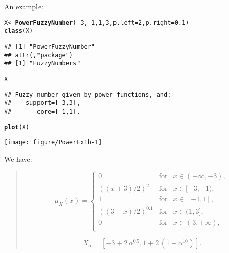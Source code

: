\documentclass[11pt]{article}\usepackage[]{graphicx}\usepackage[]{color}
\makeatletter
\newcommand{\hlnum}[1]{\textcolor[rgb]{0.686,0.059,0.569}{#1}}%
\newcommand{\hlopt}[1]{\textcolor[rgb]{0,0,0}{#1}}%
\newcommand{\hlstd}[1]{\textcolor[rgb]{0.345,0.345,0.345}{#1}}%
\newcommand{\hlkwb}[1]{\textcolor[rgb]{0.69,0.353,0.396}{#1}}%
\newcommand{\hlkwc}[1]{\textcolor[rgb]{0.333,0.667,0.333}{#1}}%
\newcommand{\hlkwd}[1]{\textcolor[rgb]{0.737,0.353,0.396}{\textbf{#1}}}%
\newenvironment{kframe}{%
 \def\at@end@of@kframe{}%
 \ifinner\ifhmode%
  \def\at@end@of@kframe{\end{minipage}}%
  \begin{minipage}{\columnwidth}%
 \fi\fi%
 \def\FrameCommand##1{\hskip\@totalleftmargin \hskip-\fboxsep
 \colorbox{shadecolor}{##1}\hskip-\fboxsep
     \hskip-\linewidth \hskip-\@totalleftmargin \hskip\columnwidth}%
 \MakeFramed {\advance\hsize-\width
   \@totalleftmargin\z@ \linewidth\hsize
   \@setminipage}}%
 {\par\unskip\endMakeFramed%
 \at@end@of@kframe}
\newenvironment{knitrout}{}{} %
\makeatother
\begin{document}
An example:
\begin{knitrout}\small
{}\color{fgcolor}\begin{kframe}
\begin{alltt}
\hlstd{X} \hlkwb{<-} \hlkwd{PowerFuzzyNumber}\hlstd{(}\hlopt{-}\hlnum{3}\hlstd{,} \hlopt{-}\hlnum{1}\hlstd{,} \hlnum{1}\hlstd{,} \hlnum{3}\hlstd{,} \hlkwc{p.left}\hlstd{=}\hlnum{2}\hlstd{,} \hlkwc{p.right}\hlstd{=}\hlnum{0.1}\hlstd{)}
\hlkwd{class}\hlstd{(X)}
\end{alltt}
\begin{verbatim}
## [1] "PowerFuzzyNumber"
## attr(,"package")
## [1] "FuzzyNumbers"
\end{verbatim}
\begin{alltt}
\hlstd{X}
\end{alltt}
\begin{verbatim}
## Fuzzy number given by power functions, and:
##    support=[-3,3],
##       core=[-1,1].
\end{verbatim}
\begin{alltt}
\hlkwd{plot}\hlstd{(X)}
\end{alltt}
\end{kframe}
\end{knitrout}

\begin{center}
\begin{knitrout}\small
{}\color{fgcolor}

{\centering \texttt{[image: figure/PowerEx1b-1]} 

}



\end{knitrout}
\end{center}

We have:
\begin{quote}
\[
\mu_{X}(x) = \left\{
\begin{array}{lll}
0      & \text{for} & x\in(-\infty,-3), \\
((x+3)/2)^{2} & \text{for} & x\in[-3,-1), \\
1      & \text{for} & x\in[-1,1], \\
((3-x)/2)^{0.1} & \text{for} & x\in(1,3], \\
0      & \text{for} & x\in(3,+\infty), \\
\end{array}
\right.
\]

\[
{X}_\alpha = [-3+2\,\alpha^{0.5}, 1+2\,(1-\alpha^{10})].
\]
\end{quote}
\end{document}
